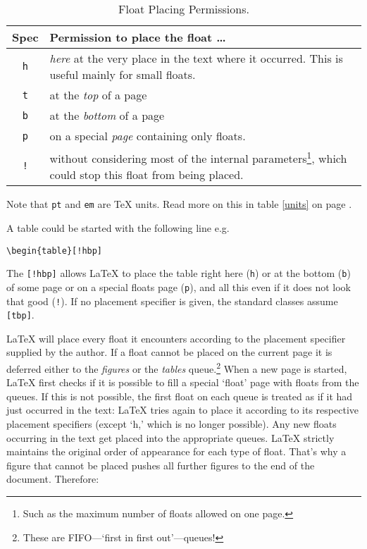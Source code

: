 \begin{table}[!bp]
\caption{Float Placing Permissions.}\label{tab:permiss}
\noindent \begin{minipage}{\textwidth}
\medskip
\begin{center}
\begin{tabular}{@{}cp{8cm}@{}}
Spec&Permission to place the float \ldots\\
\hline
\rule{0pt}{1.05em}\texttt{h} & \emph{here} at the very place in the text
  where it occurred.  This is useful mainly for small floats.\\[0.3ex]
\texttt{t} & at the \emph{top} of a page\\[0.3ex]
\texttt{b} & at the \emph{bottom} of a page\\[0.3ex]
\texttt{p} & on a special \emph{page} containing only floats.\\[0.3ex]
\texttt{!} & without considering most of the  internal parameters\footnote{Such as the
    maximum number of floats allowed  on one page.}, which could stop this
  float from being placed.
\end{tabular}
\end{center}
Note that \texttt{pt} and \texttt{em} are \TeX{} units. Read more
on this in table \ref{units} on page \pageref{units}.
\end{minipage}
\end{table}

A table could be started with the following line e.g.\
\begin{code}
\verb|\begin{table}[!hbp]|
\end{code}
\noindent The  \verb|[!hbp]| allows \LaTeX{} to 
place the table right here (\texttt{h}) or at the bottom (\texttt{b}) 
of some page
or on a special floats page (\texttt{p}), and all this even if it does not
look that good (\texttt{!}). If no placement specifier is given, the standard
classes assume \verb|[tbp]|.

\LaTeX{} will place every float it encounters according to the
placement specifier supplied by the author. If a float cannot be
placed on the current page it is deferred either to the
\emph{figures} or the \emph{tables} queue.\footnote{These are FIFO---`first in first out'---queues!}  When a new page is started,
\LaTeX{} first checks if it is possible to fill a special `float'
page with floats from the queues. If this is not possible, the first
float on each queue is treated as if it had just occurred in the
text: \LaTeX{} tries again to place it according to its
respective placement specifiers (except `h,' which is no longer
possible).  Any new floats occurring in the text get placed into the
appropriate queues. \LaTeX{} strictly maintains the original order of
appearance for each type of float. That's why a figure that cannot
be placed pushes all further figures to the end of the document.
Therefore:

